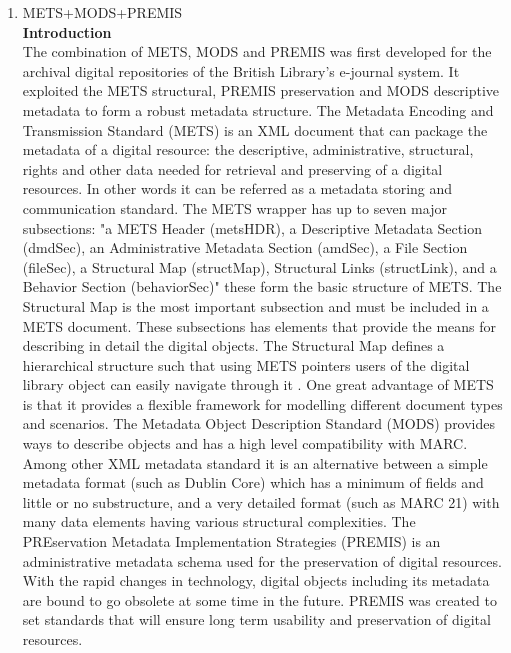 \begin{enumerate}
	\item METS+MODS+PREMIS\\
	{\bf Introduction}\\
	The combination of METS, MODS and PREMIS was first developed for the archival digital repositories of the British Library's e-journal system.\cite{Dappert2008} It exploited the METS structural, PREMIS preservation and MODS descriptive metadata to form a robust metadata structure. 
	The Metadata Encoding and Transmission Standard (METS) is an XML document that can package the metadata of a digital resource: the descriptive, administrative, structural, rights and other data needed for retrieval and preserving of a digital resources.\cite{Guenther2003} In other words it can be referred as a metadata storing and communication standard. The METS wrapper has up to seven major subsections: "a METS Header (metsHDR), a Descriptive Metadata Section (dmdSec), an Administrative Metadata Section (amdSec), a File Section (fileSec), a Structural Map (structMap), Structural Links (structLink), and a Behavior Section (behaviorSec)" these form the basic structure of METS. The Structural Map is the most important subsection and must be included in a METS document.\cite{Cheslow2014} These subsections has elements that provide the means for describing in detail the digital objects. The Structural Map defines a hierarchical structure such that using METS pointers users of the digital library object can easily navigate through it . One great advantage of METS is that it provides a flexible framework for modelling different document types and scenarios.\cite{Dappert2008}
	The Metadata Object Description Standard (MODS) provides ways to describe objects and has a high level compatibility with MARC. Among other XML metadata standard it is an alternative between a simple metadata format (such as Dublin Core) which has a minimum of fields and little or no substructure, and a very detailed format (such as MARC 21) with many data elements having various structural complexities.\cite{Guenther2003}
	The PREservation Metadata Implementation Strategies (PREMIS) is an administrative metadata schema used for the preservation of digital resources.\cite{Cheslow2014} With the rapid changes in technology, digital objects including its metadata are bound to go obsolete at some time in the future. PREMIS was created to set standards that will ensure long term usability and preservation of digital resources.
	

\end{enumerate}
